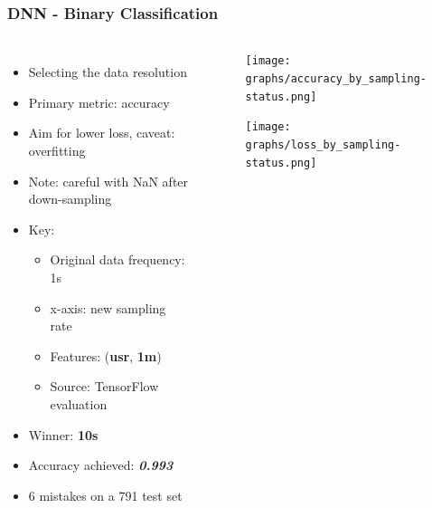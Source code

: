 \documentclass[aspectratio=169,11pt,hyperref={colorlinks=true}]{beamer}
\begin{document}
\begin{frame}
    \frametitle{DNN - Binary Classification}
    \begin{columns}
        \begin{itemize}
            \item{Selecting the data resolution}
            \item{Primary metric: accuracy}
            \item{Aim for lower loss, caveat: overfitting}
            \item{Note: careful with NaN after down-sampling}
            \item{Key:}
            \begin{itemize}
              \item{Original data frequency: 1s}
              \item{x-axis: new sampling rate}
              \item{Features: (\textbf{usr}, \textbf{1m})}
              \item{Source: TensorFlow evaluation}
            \end{itemize}
            \item{Winner: \textbf{10s}}
            \item{Accuracy achieved: \emph{\textbf{0.993}}}
            \item{6 mistakes on a 791 test set}
        \end{itemize}
        \begin{center}
        \begin{figure}
          \texttt{[image: graphs/accuracy\_by\_sampling-status.png]}
        \end{figure}
        \begin{figure}
          \texttt{[image: graphs/loss\_by\_sampling-status.png]}
        \end{figure}
      \end{center}
  \end{columns}
\end{frame}
\end{document}
